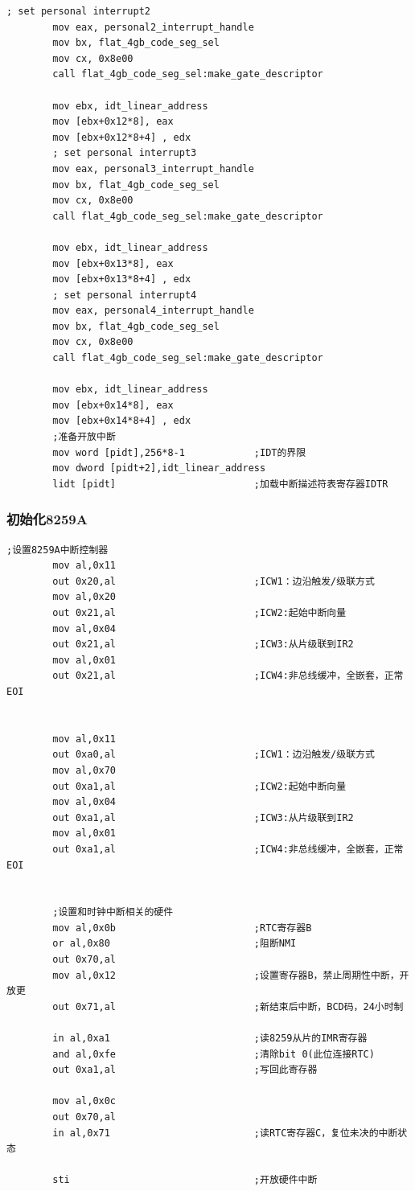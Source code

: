 \documentclass[a4paper,11pt,UTF8]{ctexart}
\begin{document}
\begin{lstlisting}[caption={安装 IDT},tabsize=4,basicstyle=\footnotesize,captionpos=b]
		; set personal interrupt2
		mov eax, personal2_interrupt_handle
		mov bx, flat_4gb_code_seg_sel
		mov cx, 0x8e00
		call flat_4gb_code_seg_sel:make_gate_descriptor

		mov ebx, idt_linear_address
		mov [ebx+0x12*8], eax
		mov [ebx+0x12*8+4] , edx
		; set personal interrupt3
		mov eax, personal3_interrupt_handle
		mov bx, flat_4gb_code_seg_sel
		mov cx, 0x8e00
		call flat_4gb_code_seg_sel:make_gate_descriptor

		mov ebx, idt_linear_address
		mov [ebx+0x13*8], eax
		mov [ebx+0x13*8+4] , edx
		; set personal interrupt4
		mov eax, personal4_interrupt_handle
		mov bx, flat_4gb_code_seg_sel
		mov cx, 0x8e00
		call flat_4gb_code_seg_sel:make_gate_descriptor

		mov ebx, idt_linear_address
		mov [ebx+0x14*8], eax
		mov [ebx+0x14*8+4] , edx
		;准备开放中断
		mov word [pidt],256*8-1            ;IDT的界限
		mov dword [pidt+2],idt_linear_address
		lidt [pidt]                        ;加载中断描述符表寄存器IDTR

	\end{lstlisting}

		\subsubsection{初始化8259A}
	\begin{lstlisting}[caption={初始化8259A},tabsize=4,basicstyle=\footnotesize,captionpos=b]
		;设置8259A中断控制器
		mov al,0x11
		out 0x20,al                        ;ICW1：边沿触发/级联方式
		mov al,0x20
		out 0x21,al                        ;ICW2:起始中断向量
		mov al,0x04
		out 0x21,al                        ;ICW3:从片级联到IR2
		mov al,0x01
		out 0x21,al                        ;ICW4:非总线缓冲，全嵌套，正常EOI


		mov al,0x11
		out 0xa0,al                        ;ICW1：边沿触发/级联方式
		mov al,0x70
		out 0xa1,al                        ;ICW2:起始中断向量
		mov al,0x04
		out 0xa1,al                        ;ICW3:从片级联到IR2
		mov al,0x01
		out 0xa1,al                        ;ICW4:非总线缓冲，全嵌套，正常EOI


		;设置和时钟中断相关的硬件 
		mov al,0x0b                        ;RTC寄存器B
		or al,0x80                         ;阻断NMI
		out 0x70,al
		mov al,0x12                        ;设置寄存器B，禁止周期性中断，开放更
		out 0x71,al                        ;新结束后中断，BCD码，24小时制

		in al,0xa1                         ;读8259从片的IMR寄存器
		and al,0xfe                        ;清除bit 0(此位连接RTC)
		out 0xa1,al                        ;写回此寄存器

		mov al,0x0c
		out 0x70,al
		in al,0x71                         ;读RTC寄存器C，复位未决的中断状态

		sti                                ;开放硬件中断

	\end{lstlisting}
\end{document}
